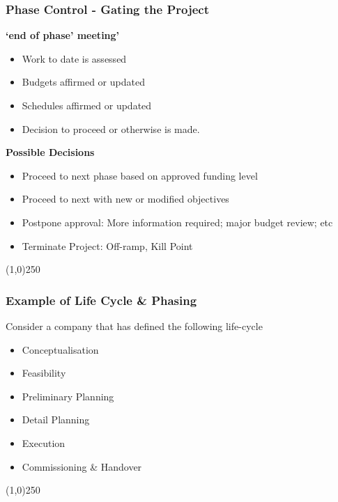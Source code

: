 \begin{frame}
\frametitle{Phase Control - Gating the Project}
\textbf{`end of phase' meeting'}\\
\begin{itemize}
	\item Work to date is assessed
	\item Budgets affirmed or updated
	\item Schedules affirmed or updated
	\item Decision to proceed or otherwise is made.
\end{itemize}
\textbf{Possible Decisions}\\
\begin{itemize}
	\item Proceed to next phase based on approved funding level
	\item Proceed to next with new or modified objectives
	\item Postpone approval: More information required; major budget review; etc
	\item  Terminate Project: Off-ramp, Kill Point
\end{itemize}
\end{frame}
\begin{center}\line(1,0){250}\end{center}



\begin{frame}
\frametitle{Example of Life Cycle \& Phasing}
Consider a company that has defined the following life-cycle\\
\begin{itemize}
	\item Conceptualisation
	\item Feasibility
	\item Preliminary Planning
	\item Detail Planning
	\item Execution
	\item Commissioning \& Handover
\end{itemize}
\end{frame}
\begin{center}\line(1,0){250}\end{center}



